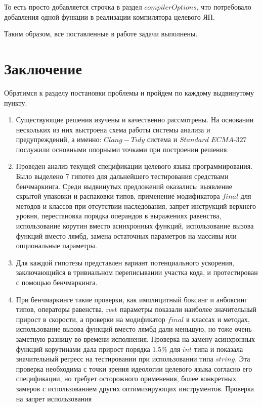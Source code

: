 \documentclass{mipt-thesis-bs}
\begin{document}
То есть просто добавляется строчка в раздел $compilerOptions$, что потребовало добавления 
одной функции в реализации компилятора целевого ЯП.

Таким образом, все поставленные в работе задачи выполнены.

\chapter{Заключение}

Обратимся к разделу постановки проблемы и пройдем по каждому выдвинутому пункту.

\begin{enumerate}
    \item Существующие решения изучены и качественно рассмотрены. На основании нескольких из них выстроена схема 
    работы системы анализа и предупреждений, а именно: $Clang-Tidy$ система и $Standard$ $ECMA$-$327$ послужили основными опорными 
    точками при построении решения.
    \item Проведен анализ текущей спецификации целевого языка программирования. Было выделено 7 гипотез для дальнейшего тестирования 
    средствами бенчмаркинга. Среди выдвинутых предложений оказались: выявление скрытой упаковки 
    и распаковки типов, применение модификатора $final$ для методов и классов при отсутствии наследования, 
    запрет инструкций верхнего уровня, перестановка порядка операндов в выражениях равенства, 
    использование корутин вместо асинхронных функций, использование вызова функций вместо лямбд,
    замена остаточных параметров на массивы или опциональные параметры.
    \item Для каждой гипотезы представлен вариант потенциального ускорения, заключающийся в тривиальном 
    переписывании участка кода, и протестирован с помощью бенчмаркинга.
    \item При бенчмаркинге такие проверки, как имплицитный боксинг и анбоксинг типов, операторы равенства, rest 
    параметры показали наиболее значительный прирост в скорости, а проверки на модификатор $final$ в классах 
    и методах, использование вызова функций вместо лямбд дали меньшую, но тоже очень заметную разницу
    во времени исполнения. Проверка на замену асинхронных функций корутинами дала прирост порядка $1.5\%$ для 
    $int$ типа и показала значительный регресс на тестировании при использовании типа $string$. Эта проверка 
    необходима с точки зрения идеологии целевого языка согласно его спецификации, но требует осторожного применения, 
    более конкретных замеров с использованием других оптимизирующих инструментов. Проверка на запрет использования 

\end{enumerate}
\end{document}
